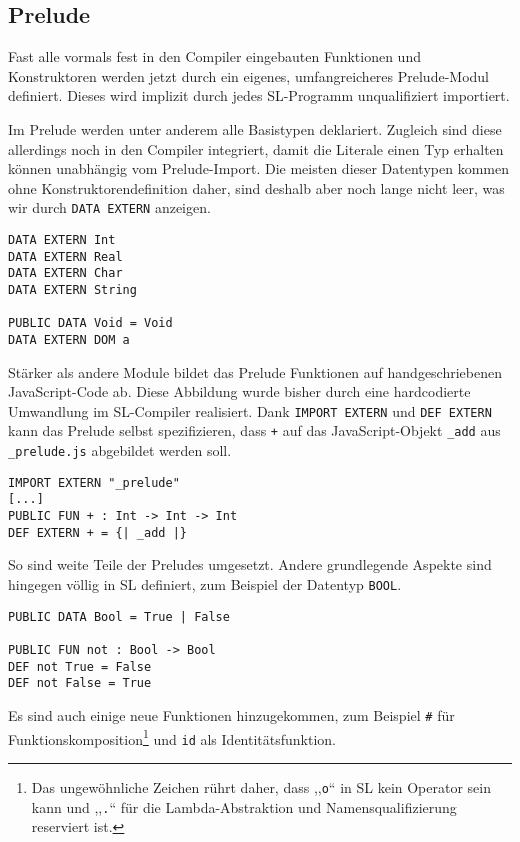 \documentclass[runningheads]{llncs}
\begin{document}
\subsection{Prelude}
\label{sec:libsPrelude}

Fast alle vormals fest in den Compiler eingebauten Funktionen und Konstruktoren
werden jetzt durch ein eigenes, umfangreicheres Prelude-Modul definiert.
Dieses wird implizit durch jedes SL-Programm unqualifiziert importiert.

Im Prelude werden unter anderem alle Basistypen deklariert. Zugleich sind
diese allerdings noch in den Compiler integriert, damit die Literale einen
Typ erhalten können unabhängig vom Prelude-Import. Die meisten dieser
Datentypen kommen ohne Konstruktorendefinition daher, sind deshalb aber noch
lange nicht leer, was wir durch \verb|DATA EXTERN| anzeigen.

\begin{verbatim}
DATA EXTERN Int
DATA EXTERN Real
DATA EXTERN Char
DATA EXTERN String

PUBLIC DATA Void = Void
DATA EXTERN DOM a
\end{verbatim}

Stärker als andere Module bildet das Prelude Funktionen auf handgeschriebenen
JavaScript-Code ab. Diese Abbildung wurde bisher durch eine hardcodierte
Umwandlung im SL-Compiler realisiert. Dank \verb|IMPORT EXTERN| und
\verb|DEF EXTERN| kann das Prelude selbst spezifizieren, dass \verb|+| auf das
JavaScript-Objekt \verb|_add| aus \verb|_prelude.js| abgebildet werden soll.

\begin{verbatim}
IMPORT EXTERN "_prelude" 
[...]
PUBLIC FUN + : Int -> Int -> Int
DEF EXTERN + = {| _add |}
\end{verbatim}

So sind weite Teile der Preludes umgesetzt. Andere grundlegende Aspekte
sind hingegen völlig in SL definiert, zum Beispiel der Datentyp \verb|BOOL|.

\begin{verbatim}
PUBLIC DATA Bool = True | False

PUBLIC FUN not : Bool -> Bool
DEF not True = False
DEF not False = True
\end{verbatim}

Es sind auch einige neue Funktionen hinzugekommen, zum Beispiel \verb|#|
für Funktionskomposition\footnote{Das ungewöhnliche Zeichen rührt daher,
dass ,,\texttt{o}`` in SL kein Operator sein kann und ,,\texttt{.}`` für die
Lambda-Abstraktion und Namensqualifizierung reserviert ist.} und
\verb|id| als Identitätsfunktion.
\end{document}
